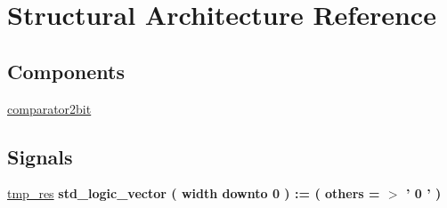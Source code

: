 \hypertarget{classgeneric__comparator_1_1_structural}{\section{Structural Architecture Reference}
\label{classgeneric__comparator_1_1_structural}
}
\subsection*{Components}
 \begin{DoxyCompactItemize}
\item 
\hypertarget{classgeneric__comparator_1_1_structural_ga76e654bcbcdc3be857beacb2216cf5b1}{\hyperlink{group___majority_voter_ga76e654bcbcdc3be857beacb2216cf5b1}{comparator2bit}  {\bfseries }  }\label{classgeneric__comparator_1_1_structural_ga76e654bcbcdc3be857beacb2216cf5b1}

\end{DoxyCompactItemize}
\subsection*{Signals}
 \begin{DoxyCompactItemize}
\item 
\hypertarget{classgeneric__comparator_1_1_structural_ga7ce2df59fd8a6a331bc933762fd3ee1a}{\hyperlink{group___majority_voter_ga7ce2df59fd8a6a331bc933762fd3ee1a}{tmp\+\_\+res} {\bfseries \textcolor{vhdlchar}{std\+\_\+logic\+\_\+vector}\textcolor{vhdlchar}{ }\textcolor{vhdlchar}{(}\textcolor{vhdlchar}{ }\textcolor{vhdlchar}{ }\textcolor{vhdlchar}{ }\textcolor{vhdlchar}{ }\textcolor{vhdlchar}{width}\textcolor{vhdlchar}{ }\textcolor{vhdlchar}{downto}\textcolor{vhdlchar}{ }\textcolor{vhdlchar}{ } \textcolor{vhdldigit}{0} \textcolor{vhdlchar}{ }\textcolor{vhdlchar}{)}\textcolor{vhdlchar}{ }\textcolor{vhdlchar}{ }\textcolor{vhdlchar}{ }\textcolor{vhdlchar}{\+:}\textcolor{vhdlchar}{=}\textcolor{vhdlchar}{ }\textcolor{vhdlchar}{(}\textcolor{vhdlchar}{ }\textcolor{vhdlchar}{ }\textcolor{vhdlchar}{others}\textcolor{vhdlchar}{ }\textcolor{vhdlchar}{ }\textcolor{vhdlchar}{=}\textcolor{vhdlchar}{ }\textcolor{vhdlchar}{$>$}\textcolor{vhdlchar}{ }\textcolor{vhdlchar}{'}\textcolor{vhdlchar}{ } \textcolor{vhdldigit}{0} \textcolor{vhdlchar}{ }\textcolor{vhdlchar}{'}\textcolor{vhdlchar}{ }\textcolor{vhdlchar}{)}\textcolor{vhdlchar}{ }} }\label{classgeneric__comparator_1_1_structural_ga7ce2df59fd8a6a331bc933762fd3ee1a}

\end{DoxyCompactItemize}
